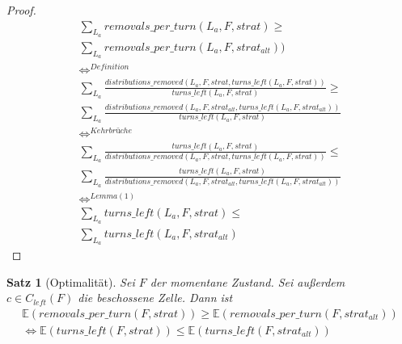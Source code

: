 \documentclass[a4paper,12pt]{llncs}
\numberwithin{equation}{section}
\newtheorem{satz}{Satz}
\begin{document}
\begin{proof}
\begin{align}
\sum_{L_a}{removals\_per\_turn(L_a, F, strat)} \geq \\
\sum_{L_a}{removals\_per\_turn(L_a, F, strat_{alt}))} \\
\Leftrightarrow^{Definition} \\
\sum_{L_a}{\frac{distributions\_removed(L_a, F, strat, turns\_left(L_a, F, strat))}{turns\_left(L_a, F, strat)}} \geq \\
\sum_{L_a}{\frac{distributions\_removed(L_a, F, strat_{alt}, turns\_left(L_a, F,  strat_{alt}))}{turns\_left(L_a, F, strat)}} \\
\Leftrightarrow^{Kehrbrüche} \\
\sum_{L_a}{\frac{turns\_left(L_a, F, strat)}{distributions\_removed(L_a, F, strat, turns\_left(L_a, F, strat))}} \leq \\
\sum_{L_a}{\frac{turns\_left(L_a, F, strat)}{distributions\_removed(L_a, F, strat_{alt}, turns\_left(L_a, F,  strat_{alt}))}} \\
\Leftrightarrow^{Lemma (1)} \\
\sum_{L_a}{turns\_left(L_a, F, strat)} \leq \\
\sum_{L_a}{turns\_left(L_a, F, strat_{alt})}
\end{align}
\end{proof}

\begin{satz}[Optimalität]
Sei $F$ der momentane Zustand.
Sei außerdem $c \in C_{left}(F)$ die beschossene Zelle.
Dann ist
\begin{align}
\mathds{E}(removals\_per\_turn(F, strat)) \geq \mathds{E}(removals\_per\_turn(F, strat_{alt})) \\
\Leftrightarrow
\mathds{E}(turns\_left(F, strat)) \leq \mathds{E}(turns\_left(F, strat_{alt})) \\
\end{align}
\end{satz}

\newpage
\end{document}
